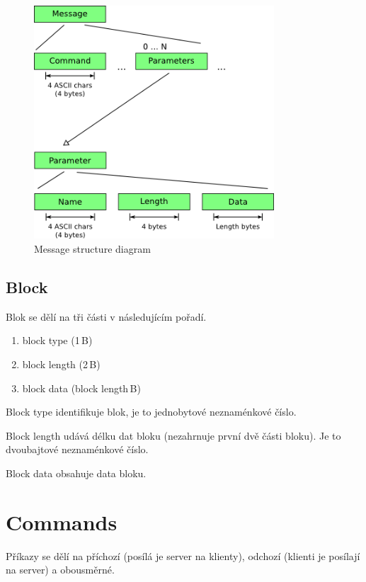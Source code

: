 \documentclass[12pt,oneside,a4paper]{report}
\begin{document}
\begin{figure}[h]
  \centering
  \includegraphics[width=0.80\textwidth]{diagrams/message_structure_diagram.png}
  \caption{Message structure diagram}
  \label{picture.message_structure}
\end{figure}

\section{Block}
\label{text.collab_message.block}

Blok se dělí na tři části v následujícím pořadí.

\begin{enumerate}
	\item block type (1\,{}B)
	\item block length (2\,{}B)
	\item block data (block length\,{}B)
\end{enumerate}

Block type identifikuje blok, je to jednobytové neznaménkové číslo.

Block length udává délku dat bloku (nezahrnuje první dvě části bloku). Je to dvoubajtové neznaménkové číslo.

Block data obsahuje data bloku.

\chapter{Commands}

Příkazy se dělí na příchozí (posílá je server na klienty), odchozí (klienti je posílají na server) a obousměrné.
\end{document}
